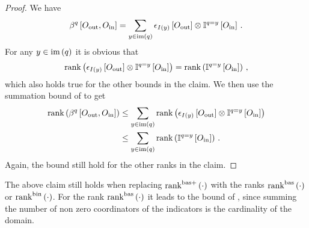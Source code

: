 \begin{proof}
    We have
    \begin{align*}
        \beta^{q}\left[O_{\mathrm{out}},O_{\mathrm{in}}\right]
        = \sum_{y\in\mathrm{im}\left(q\right)} \epsilon_{I(y)}\left[O_{\mathrm{out}}\right]
        \otimes \mathbb{I}^{q=y}\left[O_{\mathrm{in}}\right] \, .
    \end{align*}
    For any $y\in\mathrm{im}\left(q\right)$ it is obvious that
    \begin{align*}
        \mathrm{rank}\left(\epsilon_{I(y)}\left[O_{\mathrm{out}}\right]
        \otimes \mathbb{I}^{q=y}\left[O_{\mathrm{in}}\right]\right)
        = \mathrm{rank}\left(\mathbb{I}^{q=y}\left[O_{\mathrm{in}}\right]\right) \, ,
    \end{align*}
    which also holds true for the other bounds in the claim.
    We then use the summation bound of  to get
    \begin{align*}
        \mathrm{rank}\left(\beta^{q}\left[O_{\mathrm{out}},O_{\mathrm{in}}\right]\right)
        &\leq \sum_{y\in\mathrm{im}\left(q\right)} \mathrm{rank}\left(\epsilon_{I(y)}\left[O_{\mathrm{out}}\right]
        \otimes \mathbb{I}^{q=y}\left[O_{\mathrm{in}}\right]\right) \\
        &\leq  \sum_{y\in\mathrm{im}\left(q\right)} \mathrm{rank}\left(\mathbb{I}^{q=y}\left[O_{\mathrm{in}}\right]\right) \, .
    \end{align*}
    Again, the bound still hold for the other ranks in the claim.
\end{proof}

The above claim still holds when replacing $\mathrm{rank}^{\mathrm{bas+}}\left(\cdot\right)$ with the ranks $\mathrm{rank}^{\mathrm{bas}}\left(\cdot\right)$ or $\mathrm{rank}^{\mathrm{bin}}\left(\cdot\right)$.
For the rank $\mathrm{rank}^{\mathrm{bas}}\left(\cdot\right)$ it leads to the bound of , since summing the number of non zero coordinators of the indicators is the cardinality of the domain.


